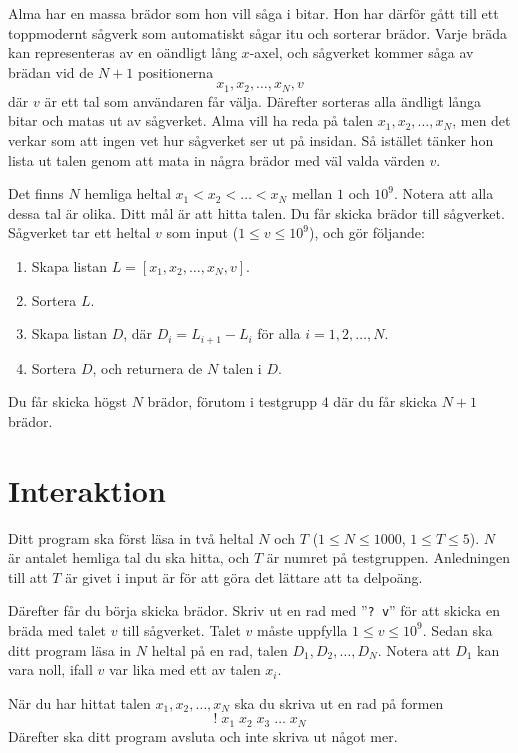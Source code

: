 
Alma har en massa brädor som hon vill såga i bitar. Hon har därför gått till ett toppmodernt
sågverk som automatiskt sågar itu och sorterar brädor. Varje bräda kan representeras av en oändligt
lång $x$-axel, och sågverket kommer såga av brädan vid de $N+1$ positionerna 
$$x_1, x_2, \dots, x_N, v$$
där $v$ är ett tal som användaren får välja. Därefter sorteras alla
ändligt långa bitar och matas ut av sågverket. Alma vill ha reda på talen $x_1, x_2, \dots, x_N$, men det verkar som att ingen vet hur sågverket ser ut på insidan.
Så istället tänker hon lista ut talen genom att mata in några brädor med väl valda värden $v$.


Det finns $N$ hemliga heltal $x_1 < x_2 < \dots < x_N$ mellan $1$ och $10^9$. 
Notera att alla dessa tal är olika. Ditt mål är att hitta talen. Du får skicka brädor till sågverket. 
Sågverket tar ett heltal $v$ som input ($1 \leq v \leq 10^9$), och gör följande:

\begin{enumerate}
  \item Skapa listan $L = [x_1, x_2, \dots, x_N, v]$.
  \item Sortera $L$.
  \item Skapa listan $D$, där $D_i = L_{i+1}-L_i$ för alla $i = 1, 2, \dots, N$.
  \item Sortera $D$, och returnera de $N$ talen i $D$.
\end{enumerate}

Du får skicka högst $N$ brädor, förutom i testgrupp $4$ där du får skicka $N+1$ brädor.

\section*{Interaktion}
Ditt program ska först läsa in två heltal $N$ och $T$ ($1 \leq N \leq 1000$, $1 \leq T \leq 5$).
$N$ är antalet hemliga tal du ska hitta, och $T$ är numret på testgruppen. Anledningen till att $T$ 
är givet i input är för att göra det lättare att ta delpoäng.

Därefter får du börja skicka brädor. Skriv ut en rad med ''\verb|? v|'' för att skicka en bräda med talet
$v$ till sågverket. Talet $v$ måste uppfylla $1 \leq v \leq 10^9$. Sedan ska
ditt program läsa in $N$ heltal på en rad, talen $D_1, D_2, \dots, D_N$. Notera att $D_1$ kan vara
noll, ifall $v$ var lika med ett av talen $x_i$.

När du har hittat talen $x_1, x_2, \dots, x_N$ ska du skriva ut en rad på formen 
$$! \; x_1 \; x_2 \; x_3 \; \dots \; x_N$$
Därefter ska ditt program avsluta och inte skriva ut något mer.


